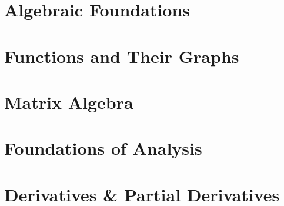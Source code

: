 \documentclass[10pt,oneside]{book}
\begin{document}


\mainmatter

\part{Algebraic Foundations}










\part{Functions and Their Graphs}






\part{Matrix Algebra}











\part{Foundations of Analysis}





\part{Derivatives \& Partial Derivatives}














\end{document}
